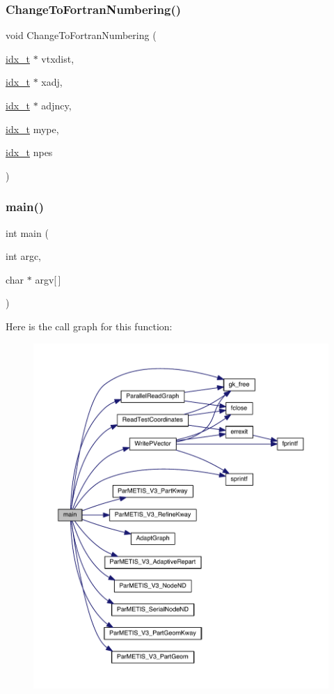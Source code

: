 \subsubsection{\texorpdfstring{Change\+To\+Fortran\+Numbering()}{ChangeToFortranNumbering()}}
{\footnotesize\ttfamily void Change\+To\+Fortran\+Numbering (\begin{DoxyParamCaption}\item[{\hyperlink{a00876_aaa5262be3e700770163401acb0150f52}{idx\+\_\+t} $\ast$}]{vtxdist,  }\item[{\hyperlink{a00876_aaa5262be3e700770163401acb0150f52}{idx\+\_\+t} $\ast$}]{xadj,  }\item[{\hyperlink{a00876_aaa5262be3e700770163401acb0150f52}{idx\+\_\+t} $\ast$}]{adjncy,  }\item[{\hyperlink{a00876_aaa5262be3e700770163401acb0150f52}{idx\+\_\+t}}]{mype,  }\item[{\hyperlink{a00876_aaa5262be3e700770163401acb0150f52}{idx\+\_\+t}}]{npes }\end{DoxyParamCaption})}

\mbox{\label{a00942_a0ddf1224851353fc92bfbff6f499fa97}} 
\subsubsection{\texorpdfstring{main()}{main()}}
{\footnotesize\ttfamily int main (\begin{DoxyParamCaption}\item[{int}]{argc,  }\item[{char $\ast$}]{argv\mbox{[}$\,$\mbox{]} }\end{DoxyParamCaption})}

Here is the call graph for this function\+:\nopagebreak
\begin{figure}[H]
\begin{center}
\leavevmode
\includegraphics[width=350pt]{a00942_a0ddf1224851353fc92bfbff6f499fa97_cgraph}
\end{center}
\end{figure}
